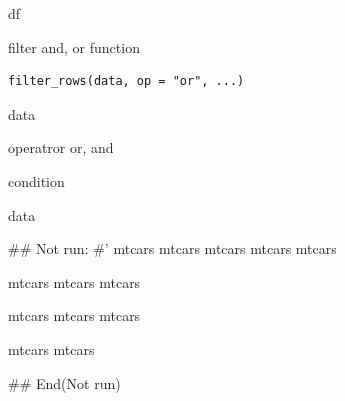 \documentclass[a4paper]{book}
\begin{document}
%
\begin{Value}
df
\end{Value}
%
\begin{Examples}
\end{Examples}
%
\begin{Description}
filter and,  or function
\end{Description}
%
\begin{Usage}
\begin{verbatim}
filter_rows(data, op = "or", ...)
\end{verbatim}
\end{Usage}
%
\begin{Arguments}
\begin{ldescription}
\item[\code{data}] data

\item[\code{op}] operatror or, and

\item[\code{...}] condition
\end{ldescription}
\end{Arguments}
%
\begin{Value}
data
\end{Value}
%
\begin{Examples}
\begin{ExampleCode}

\#\# Not run: 
#'
mtcars %
mtcars %
mtcars %
mtcars %
mtcars %

mtcars %
mtcars %
mtcars %

mtcars %
mtcars %
mtcars %

mtcars %
mtcars %

## End(Not run)

\end{ExampleCode}
\end{Examples}
\end{document}
